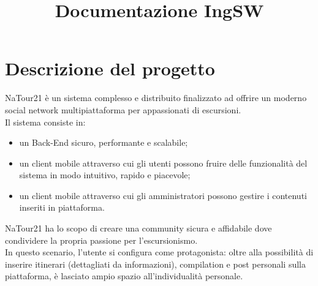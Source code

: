\documentclass{natourDoc}
\title{Documentazione IngSW} %
\begin{document}





\marginscreate %
\cover %
\toc %


\section{Descrizione del progetto}
NaTour21 è un sistema complesso e distribuito finalizzato ad offrire un moderno social network multipiattaforma per appassionati di escursioni.\\

Il sistema consiste in:
\begin{itemize}
	\item un Back-End sicuro, performante e scalabile;
	\item un client mobile attraverso cui gli
	      utenti possono fruire delle funzionalità del sistema in modo intuitivo, rapido e piacevole;
	\item un client mobile attraverso cui gli amministratori possono gestire i contenuti inseriti in piattaforma.\\
\end{itemize}

NaTour21 ha lo scopo di creare una community sicura e affidabile dove condividere la propria passione per l'escursionismo.\\

In questo scenario, l'utente si configura come protagonista: oltre alla possibilità di inserire itinerari (dettagliati da informazioni), compilation e post personali sulla piattaforma,
è lasciato ampio spazio all'individualità personale.\\
\end{document}
